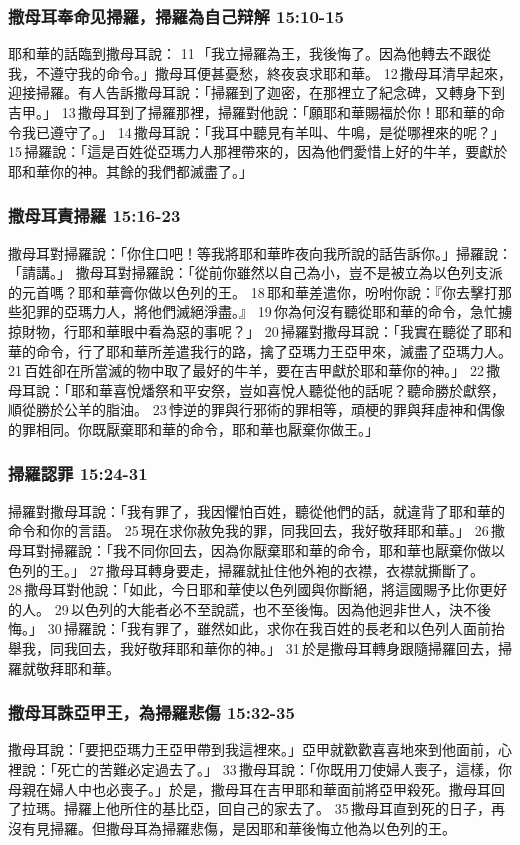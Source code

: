 \subsubsection{撒母耳奉命见掃羅，掃羅為自己辩解 15:10-15}
耶和華的話臨到撒母耳說： 11 「我立掃羅為王，我後悔了。因為他轉去不跟從我，不遵守我的命令。」撒母耳便甚憂愁，終夜哀求耶和華。 12 撒母耳清早起來，迎接掃羅。有人告訴撒母耳說：「掃羅到了迦密，在那裡立了紀念碑，又轉身下到吉甲。」 13 撒母耳到了掃羅那裡，掃羅對他說：「願耶和華賜福於你！耶和華的命令我已遵守了。」 14 撒母耳說：「我耳中聽見有羊叫、牛鳴，是從哪裡來的呢？」 15 掃羅說：「這是百姓從亞瑪力人那裡帶來的，因為他們愛惜上好的牛羊，要獻於耶和華你的神。其餘的我們都滅盡了。」 

\subsubsection{撒母耳責掃羅 15:16-23}
撒母耳對掃羅說：「你住口吧！等我將耶和華昨夜向我所說的話告訴你。」掃羅說：「請講。」
撒母耳對掃羅說：「從前你雖然以自己為小，豈不是被立為以色列支派的元首嗎？耶和華膏你做以色列的王。 18 耶和華差遣你，吩咐你說：『你去擊打那些犯罪的亞瑪力人，將他們滅絕淨盡。』 19 你為何沒有聽從耶和華的命令，急忙擄掠財物，行耶和華眼中看為惡的事呢？」 20 掃羅對撒母耳說：「我實在聽從了耶和華的命令，行了耶和華所差遣我行的路，擒了亞瑪力王亞甲來，滅盡了亞瑪力人。 21 百姓卻在所當滅的物中取了最好的牛羊，要在吉甲獻於耶和華你的神。」 22 撒母耳說：「耶和華喜悅燔祭和平安祭，豈如喜悅人聽從他的話呢？聽命勝於獻祭，順從勝於公羊的脂油。 23 悖逆的罪與行邪術的罪相等，頑梗的罪與拜虛神和偶像的罪相同。你既厭棄耶和華的命令，耶和華也厭棄你做王。」

\subsubsection{掃羅認罪 15:24-31}
掃羅對撒母耳說：「我有罪了，我因懼怕百姓，聽從他們的話，就違背了耶和華的命令和你的言語。 25 現在求你赦免我的罪，同我回去，我好敬拜耶和華。」 26 撒母耳對掃羅說：「我不同你回去，因為你厭棄耶和華的命令，耶和華也厭棄你做以色列的王。」 27 撒母耳轉身要走，掃羅就扯住他外袍的衣襟，衣襟就撕斷了。 28 撒母耳對他說：「如此，今日耶和華使以色列國與你斷絕，將這國賜予比你更好的人。 29 以色列的大能者必不至說謊，也不至後悔。因為他迥非世人，決不後悔。」 30 掃羅說：「我有罪了，雖然如此，求你在我百姓的長老和以色列人面前抬舉我，同我回去，我好敬拜耶和華你的神。」 31 於是撒母耳轉身跟隨掃羅回去，掃羅就敬拜耶和華。

\subsubsection{撒母耳誅亞甲王，為掃羅悲傷 15:32-35}
撒母耳說：「要把亞瑪力王亞甲帶到我這裡來。」亞甲就歡歡喜喜地來到他面前，心裡說：「死亡的苦難必定過去了。」 33 撒母耳說：「你既用刀使婦人喪子，這樣，你母親在婦人中也必喪子。」於是，撒母耳在吉甲耶和華面前將亞甲殺死。撒母耳回了拉瑪。掃羅上他所住的基比亞，回自己的家去了。 35 撒母耳直到死的日子，再沒有見掃羅。但撒母耳為掃羅悲傷，是因耶和華後悔立他為以色列的王。

